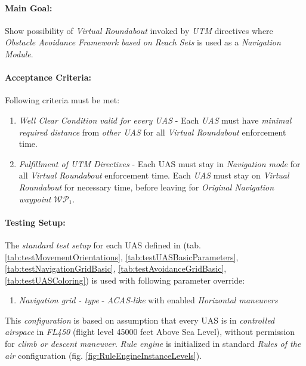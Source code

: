     \paragraph{Main Goal:} Show possibility of \emph{Virtual Roundabout} invoked by \emph{UTM} directives where \emph{Obstacle Avoidance Framework based on Reach Sets} is used as a \emph{Navigation Module}.
    
    \paragraph{Acceptance  Criteria:} Following criteria must be met:
    
    \begin{enumerate}
        \item \emph{Well Clear Condition valid for every UAS} - Each \emph{UAS} must have \emph{minimal required distance} from \emph{other UAS} for all \emph{Virtual Roundabout} enforcement time.
        
        \item \emph{Fulfillment of UTM Directives} - Each UAS must stay in \emph{Navigation mode} for all \emph{Virtual Roundabout} enforcement time. Each \emph{UAS} must stay on \emph{Virtual Roundabout} for necessary time, before leaving for \emph{Original Navigation waypoint $\mathscr{WP}_1$}.
    \end{enumerate}
    
    \paragraph{Testing Setup:} The \emph{standard test setup} for each UAS defined in (tab. \ref{tab:testMovementOrientations}, \ref{tab:testUASBasicParameters}, \ref{tab:testNavigationGridBasic}, \ref{tab:testAvoidanceGridBasic}, \ref{tab:testUASColoring}) is used with following parameter override:
    \begin{enumerate}
        \item \emph{Navigation grid - type} - \emph{ACAS-like} with enabled \emph{Horizontal maneuvers}
    \end{enumerate}
    
    This \emph{configuration} is based on assumption that every UAS is in \emph{controlled airspace} in \emph{FL450} (flight level 45000 feet Above Sea Level), without permission for \emph{climb or descent maneuver}. \emph{Rule engine} is initialized in standard \emph{Rules of the air} configuration (fig. \ref{fig:RuleEngineInstanceLevels}).
    
